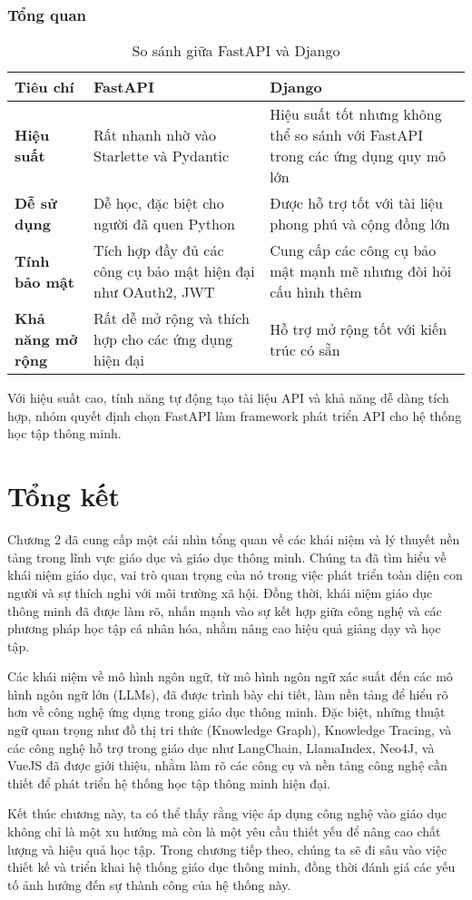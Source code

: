 \subsubsection{Tổng quan}
\begin{table}[H]
    \centering
    \caption{So sánh giữa FastAPI và Django}
    \begin{tabular}{|p{3cm}|p{6.5cm}|p{6.5cm}|}
    \hline
    \textbf{Tiêu chí} & \textbf{FastAPI} & \textbf{Django} \\
    \hline
    \textbf{Hiệu suất} & Rất nhanh nhờ vào Starlette và Pydantic & Hiệu suất tốt nhưng không thể so sánh với FastAPI trong các ứng dụng quy mô lớn \\
    \hline
    \textbf{Dễ sử dụng} & Dễ học, đặc biệt cho người đã quen Python & Được hỗ trợ tốt với tài liệu phong phú và cộng đồng lớn \\
    \hline
    \textbf{Tính bảo mật} & Tích hợp đầy đủ các công cụ bảo mật hiện đại như OAuth2, JWT & Cung cấp các công cụ bảo mật mạnh mẽ nhưng đòi hỏi cấu hình thêm \\
    \hline
    \textbf{Khả năng mở rộng} & Rất dễ mở rộng và thích hợp cho các ứng dụng hiện đại & Hỗ trợ mở rộng tốt với kiến trúc có sẵn \\
    \hline
    \end{tabular}

\end{table}
Với hiệu suất cao, tính năng tự động tạo tài liệu API và khả năng dễ dàng tích hợp, nhóm quyết định chọn FastAPI làm framework phát triển API cho hệ thống học tập thông minh.
\section{Tổng kết}
\par Chương 2 đã cung cấp một cái nhìn tổng quan về các khái niệm và lý thuyết nền tảng trong lĩnh vực giáo dục và giáo dục thông minh. Chúng ta đã tìm hiểu về khái niệm giáo dục, vai trò quan trọng của nó trong việc phát triển toàn diện con người và sự thích nghi với môi trường xã hội. Đồng thời, khái niệm giáo dục thông minh đã được làm rõ, nhấn mạnh vào sự kết hợp giữa công nghệ và các phương pháp học tập cá nhân hóa, nhằm nâng cao hiệu quả giảng dạy và học tập.

\par Các khái niệm về mô hình ngôn ngữ, từ mô hình ngôn ngữ xác suất đến các mô hình ngôn ngữ lớn (LLMs), đã được trình bày chi tiết, làm nền tảng để hiểu rõ hơn về công nghệ ứng dụng trong giáo dục thông minh. Đặc biệt, những thuật ngữ quan trọng như đồ thị tri thức (Knowledge Graph), Knowledge Tracing, và các công nghệ hỗ trợ trong giáo dục như LangChain, LlamaIndex, Neo4J, và VueJS đã được giới thiệu, nhằm làm rõ các công cụ và nền tảng công nghệ cần thiết để phát triển hệ thống học tập thông minh hiện đại.

\par Kết thúc chương này, ta có thể thấy rằng việc áp dụng công nghệ vào giáo dục không chỉ là một xu hướng mà còn là một yêu cầu thiết yếu để nâng cao chất lượng và hiệu quả học tập. Trong chương tiếp theo, chúng ta sẽ đi sâu vào việc thiết kế và triển khai hệ thống giáo dục thông minh, đồng thời đánh giá các yếu tố ảnh hưởng đến sự thành công của hệ thống này.